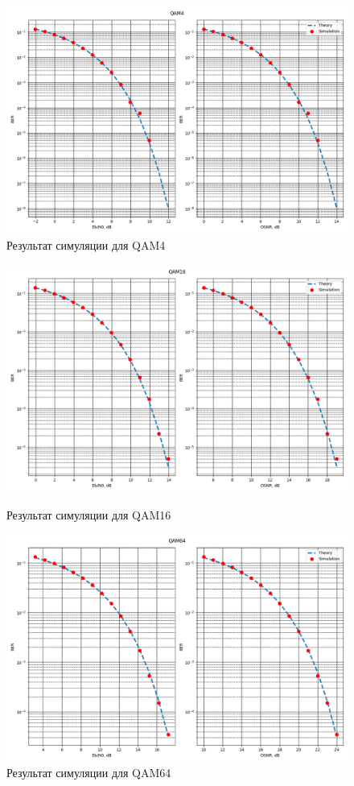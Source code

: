 \documentclass[a4paper, 14pt]{extarticle}
\begin{document}
\begin{figure}[h]
    \centering
    \includegraphics[width=1\textwidth]{QAM4.png}
    \caption{Результат симуляции для QAM4}
    \label{fig:qam4}
\end{figure}
\begin{figure}[]
	\centering
    \includegraphics[width=1\textwidth]{QAM16.png}
    \caption{Результат симуляции для QAM16}
    \label{fig:qam16}
	\centering
    \includegraphics[width=1\textwidth]{QAM64.png}
    \caption{Результат симуляции для QAM64}
    \label{fig:qam64}
\end{figure}
\end{document}
